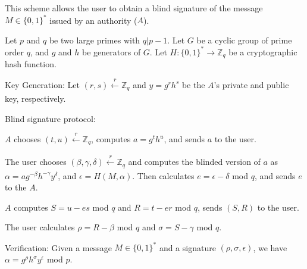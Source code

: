 \documentclass[conference]{llncs}
\begin{document}
This scheme allows the user to obtain a blind signature of the message $M\in \{0,1\}^*$ issued by an authority ($A$). 

\begin{definition}
Let $p$ and $q$ be two large primes with $q|p-1$. Let $G$ be a cyclic group of prime order $q$, and $g$ and $h$ be generators of $G$. Let $H:\{0,1\}^*\rightarrow \mathbb{Z}_q$ be a cryptographic hash function.
\begin{compactdesc}
\item[Key Generation:] Let $(r,s) \xleftarrow[]{r}\mathbb{Z}_q$ and $y=g^rh^s$ be the $A$'s private and public key, respectively.
\item[Blind signature protocol:]
\begin{compactenum}
    \item $A$ chooses $(t,u) \xleftarrow[]{r}\mathbb{Z}_q$, computes $a = g^th^u$, and sends $a$ to the user.
    \item The user chooses $(\beta, \gamma, \delta) \xleftarrow[]{r}\mathbb{Z}_q$ and computes the blinded version of $a$ as $\alpha=ag^{-\beta} h^{-\gamma} y^\delta$, and $\epsilon=H(M,\alpha)$. Then calculates $e=\epsilon-\delta$ mod $q$, and sends $e$ to the $A$.
    \item $A$ computes $S=u-es$ mod $q$ and $R=t-er$ mod $q$, sends $(S,R)$ to the user.
    \item The user calculates $\rho=R-\beta$ mod $q$ and $\sigma=S-\gamma$ mod $q$.
\end{compactenum}
\item[Verification:] Given a message $M\in \{0,1\}^*$ and a signature $(\rho,\sigma,\epsilon)$, we have $\alpha=g^\rho h^\sigma y^\epsilon$ mod $p$.
\end{compactdesc}
\end{definition}
\end{document}
